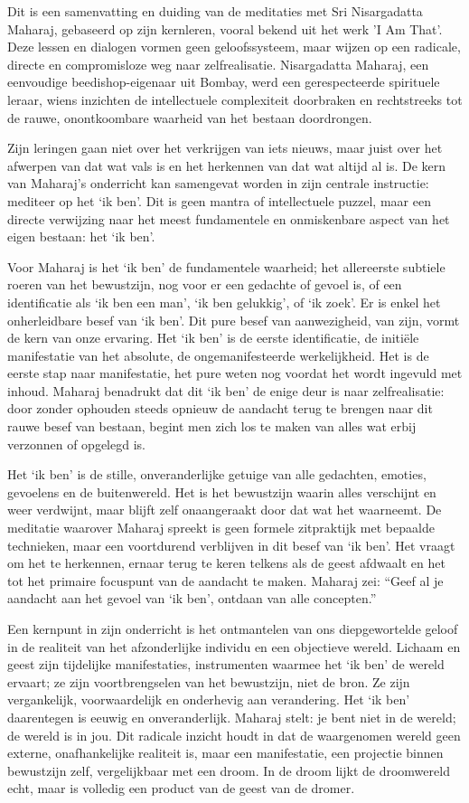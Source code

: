 Dit is een samenvatting en duiding van de meditaties met Sri Nisargadatta Maharaj, gebaseerd op zijn kernleren, vooral bekend uit het werk 'I Am That'. Deze lessen en dialogen vormen geen geloofssysteem, maar wijzen op een radicale, directe en compromisloze weg naar zelfrealisatie. Nisargadatta Maharaj, een eenvoudige beedishop-eigenaar uit Bombay, werd een gerespecteerde spirituele leraar, wiens inzichten de intellectuele complexiteit doorbraken en rechtstreeks tot de rauwe, onontkoombare waarheid van het bestaan doordrongen.

Zijn leringen gaan niet over het verkrijgen van iets nieuws, maar juist over het afwerpen van dat wat vals is en het herkennen van dat wat altijd al is. De kern van Maharaj’s onderricht kan samengevat worden in zijn centrale instructie: mediteer op het ‘ik ben’. Dit is geen mantra of intellectuele puzzel, maar een directe verwijzing naar het meest fundamentele en onmiskenbare aspect van het eigen bestaan: het ‘ik ben’.

Voor Maharaj is het ‘ik ben’ de fundamentele waarheid; het allereerste subtiele roeren van het bewustzijn, nog voor er een gedachte of gevoel is, of een identificatie als ‘ik ben een man’, ‘ik ben gelukkig’, of ‘ik zoek’. Er is enkel het onherleidbare besef van ‘ik ben’. Dit pure besef van aanwezigheid, van zijn, vormt de kern van onze ervaring. Het ‘ik ben’ is de eerste identificatie, de initiële manifestatie van het absolute, de ongemanifesteerde werkelijkheid. Het is de eerste stap naar manifestatie, het pure weten nog voordat het wordt ingevuld met inhoud. Maharaj benadrukt dat dit ‘ik ben’ de enige deur is naar zelfrealisatie: door zonder ophouden steeds opnieuw de aandacht terug te brengen naar dit rauwe besef van bestaan, begint men zich los te maken van alles wat erbij verzonnen of opgelegd is.

Het ‘ik ben’ is de stille, onveranderlijke getuige van alle gedachten, emoties, gevoelens en de buitenwereld. Het is het bewustzijn waarin alles verschijnt en weer verdwijnt, maar blijft zelf onaangeraakt door dat wat het waarneemt. De meditatie waarover Maharaj spreekt is geen formele zitpraktijk met bepaalde technieken, maar een voortdurend verblijven in dit besef van ‘ik ben’. Het vraagt om het te herkennen, ernaar terug te keren telkens als de geest afdwaalt en het tot het primaire focuspunt van de aandacht te maken. Maharaj zei: “Geef al je aandacht aan het gevoel van ‘ik ben’, ontdaan van alle concepten.”

Een kernpunt in zijn onderricht is het ontmantelen van ons diepgewortelde geloof in de realiteit van het afzonderlijke individu en een objectieve wereld. Lichaam en geest zijn tijdelijke manifestaties, instrumenten waarmee het ‘ik ben’ de wereld ervaart; ze zijn voortbrengselen van het bewustzijn, niet de bron. Ze zijn vergankelijk, voorwaardelijk en onderhevig aan verandering. Het ‘ik ben’ daarentegen is eeuwig en onveranderlijk. Maharaj stelt: je bent niet in de wereld; de wereld is in jou. Dit radicale inzicht houdt in dat de waargenomen wereld geen externe, onafhankelijke realiteit is, maar een manifestatie, een projectie binnen bewustzijn zelf, vergelijkbaar met een droom. In de droom lijkt de droomwereld echt, maar is volledig een product van de geest van de dromer.

